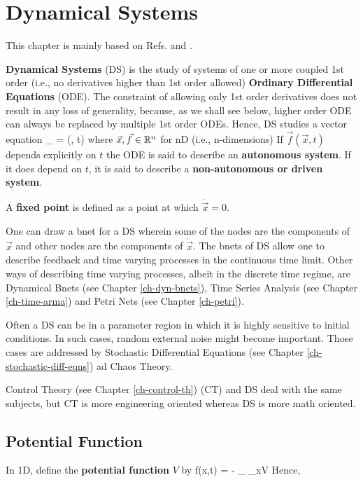 \chapter{Dynamical Systems}
\label{ch-dynamical-sys}

This chapter is mainly based on 
Refs.\cite{dynamical-fuchs} and \cite{wiki-phase-plane}.

{\bf Dynamical Systems} (DS)
is the study of systems of one or more
coupled 1st order (i.e., no derivatives higher than 1st order allowed) {\bf Ordinary Differential Equations} (ODE).
The constraint of allowing only 1st order
derivatives does not result in any loss of generality,
because, as we shall see below, higher order ODE
can always be replaced by multiple 1st order ODEs.
Hence, DS studies a vector equation
\beq
{}_{}
= (, t)
\eeq
where $\vec{x},  \vec{f}\in{ \mathbb{R}}^n$ for nD (i.e., n-dimensions)
If $\vec{f}(\vec{x},t)$
depends explicitly on $t$ 
the ODE is said
to describe an {\bf autonomous
system}.
If it does depend on $t$,
it is said to describe a
{\bf non-autonomous or driven
system}.

A {\bf fixed point} is defined as a point
at which $\dot{\vec{x}}=0$.

One can draw a bnet for a DS wherein some
of the nodes are the components of $\vec{x}$
and other nodes are the components of $\dot{\vec{x}}$.
The bnets of DS allow one to describe feedback and time
varying processes in the continuous time limit.
Other ways of describing time varying processes, albeit in the
discrete time regime, are Dynamical Bnets (see Chapter \ref{ch-dyn-bnets}),
Time Series Analysis (see Chapter \ref{ch-time-arma})
and Petri Nets (see Chapter \ref{ch-petri}).


Often a DS can be in a parameter region
in which it is highly sensitive to initial conditions. In such cases, random external noise 
might become important. Those cases are 
addressed by Stochastic Differential Equations (see Chapter
\ref{ch-stochastic-diff-eqns})
ad Chaos Theory.

Control Theory (see Chapter \ref{ch-control-th}) (CT)
and DS deal with the same subjects, but CT is more
engineering oriented whereas DS is more math oriented.
\section{Potential Function}

In 1D, define the {\bf potential function} $V$ by
\beq
f(x,t) = -
_{ \partial_xV}
\eeq
Hence,

